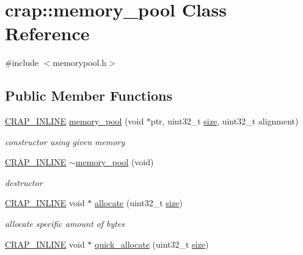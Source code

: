 \hypertarget{classcrap_1_1memory__pool}{\section{crap\+:\+:memory\+\_\+pool Class Reference}
\label{classcrap_1_1memory__pool}
}


{\ttfamily \#include $<$memorypool.\+h$>$}

\subsection*{Public Member Functions}
\begin{DoxyCompactItemize}
\item 
\hyperlink{config__x86_8h_a5a40526b8d842e7ff731509998bb0f1c}{C\+R\+A\+P\+\_\+\+I\+N\+L\+I\+N\+E} \hyperlink{classcrap_1_1memory__pool_a9d8b04bac053bfd845f4619bfbc2ac64}{memory\+\_\+pool} (void $\ast$ptr, uint32\+\_\+t \hyperlink{classcrap_1_1memory__pool_a2f3e04e4e27dcdef3ded60f2ee7ee939}{size}, uint32\+\_\+t alignment)
\begin{DoxyCompactList}\small\item\em constructor using given memory \end{DoxyCompactList}\item 
\hyperlink{config__x86_8h_a5a40526b8d842e7ff731509998bb0f1c}{C\+R\+A\+P\+\_\+\+I\+N\+L\+I\+N\+E} \hyperlink{classcrap_1_1memory__pool_ac9c5827710ea2e286081ccf215de18c8}{$\sim$memory\+\_\+pool} (void)
\begin{DoxyCompactList}\small\item\em destructor \end{DoxyCompactList}\item 
\hyperlink{config__x86_8h_a5a40526b8d842e7ff731509998bb0f1c}{C\+R\+A\+P\+\_\+\+I\+N\+L\+I\+N\+E} void $\ast$ \hyperlink{classcrap_1_1memory__pool_afb562c0ca4a48a1d703fe12a870a772e}{allocate} (uint32\+\_\+t \hyperlink{classcrap_1_1memory__pool_a2f3e04e4e27dcdef3ded60f2ee7ee939}{size})
\begin{DoxyCompactList}\small\item\em allocate specific amount of bytes \end{DoxyCompactList}\item 
\hyperlink{config__x86_8h_a5a40526b8d842e7ff731509998bb0f1c}{C\+R\+A\+P\+\_\+\+I\+N\+L\+I\+N\+E} void $\ast$ \hyperlink{classcrap_1_1memory__pool_a5cabbef2d40ea3872bad37dcdf6ae0f1}{quick\+\_\+allocate} (uint32\+\_\+t \hyperlink{classcrap_1_1memory__pool_a2f3e04e4e27dcdef3ded60f2ee7ee939}{size})

\end{DoxyCompactItemize}
